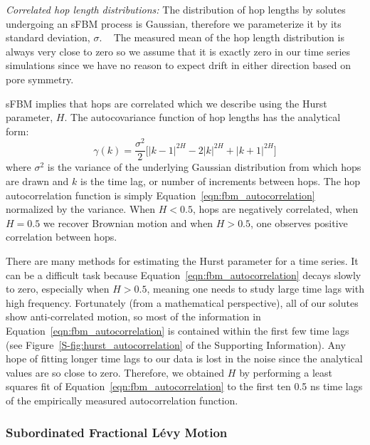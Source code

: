\documentclass[journal=jctcce,manuscript=article]{achemso}
\begin{document}
  \textit{Correlated hop length distributions:} The distribution of hop 
  lengths by solutes undergoing an sFBM process is Gaussian, therefore we 
  parameterize it by its standard deviation, $\sigma$.
  ~\cite{metzler_random_2000, metzler_anomalous_2014,neusius_subdiffusion_2009}
  The measured mean of the hop length distribution is always very close to zero so
  we assume that it is exactly zero in our time series simulations since we have 
  no reason to expect drift in either direction based on pore symmetry.

  sFBM implies that hops are correlated which we describe using the Hurst
  parameter, $H$. The autocovariance function of hop lengths has the
  analytical form:~\cite{mandelbrot_fractional_1968}
  \begin{equation}
    \gamma(k) = \dfrac{\sigma^2}{2}\bigg[|k-1|^{2H} - 2|k|^{2H} + |k+1|^{2H}\bigg]
  \label{eqn:fbm_autocorrelation}
  \end{equation}
  where $\sigma^2$ is the variance of the underlying Gaussian distribution from
  which hops are drawn and $k$ is the time lag, or number of increments between
  hops. The hop autocorrelation function is simply
  Equation~\ref{eqn:fbm_autocorrelation} normalized by the variance.  When $H <
  0.5$, hops are negatively correlated, when $H = 0.5$ we recover Brownian
  motion and when $H > 0.5$, one observes positive correlation between hops. 
 
  There are many methods for estimating the Hurst parameter for a time series.
  \cite{clegg_practical_2006} It can be a difficult task because 
  Equation~\ref{eqn:fbm_autocorrelation} decays slowly to zero, especially when 
  $H > 0.5$, meaning one needs to study large time lags with high frequency.
  Fortunately (from a mathematical perspective), all of our solutes show anti-correlated motion, so most of the information in
  Equation~\ref{eqn:fbm_autocorrelation} is contained within the first few time lags (see 
  Figure~\ref{S-fig:hurst_autocorrelation} of the Supporting Information). Any hope of
  fitting longer time lags to our data is lost in the noise since the analytical values
  are so close to zero. Therefore, we obtained $H$ by performing a least squares fit of 
  Equation~\ref{eqn:fbm_autocorrelation} to the first 
  ten 0.5 ns time lags of the empirically measured autocorrelation function.

  \subsubsection{Subordinated Fractional L\'evy Motion}\label{method:sflm}
\end{document}
